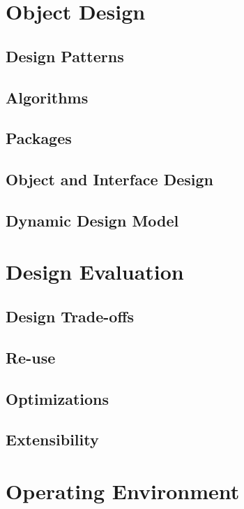 \documentclass{report}
\begin{document}
\chapter{Object Design} %
\label{ch:object-design}

\section{Design Patterns}

\section{Algorithms}

\section{Packages}

\section{Object and Interface Design}

\section{Dynamic Design Model}

\chapter{Design Evaluation} %
\label{ch:design-evaluation}

\section{Design Trade-offs}

\section{Re-use}

\section{Optimizations}

\section{Extensibility}

\chapter{Operating Environment} %
\label{ch:operating-environment}
\end{document}

